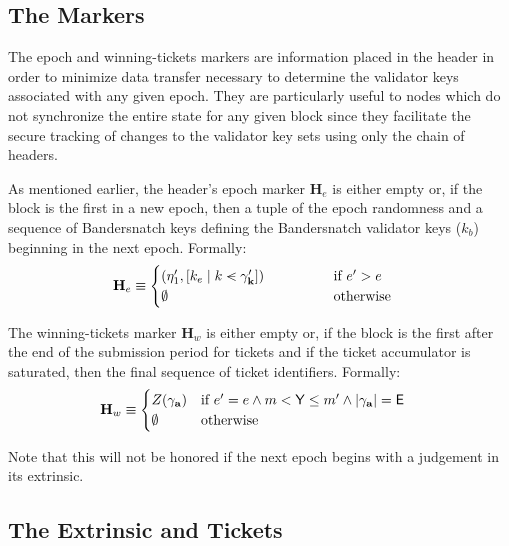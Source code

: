 \subsection{The Markers}\label{sec:epochmarker}

The epoch and winning-tickets markers are information placed in the header in order to minimize data transfer necessary to determine the validator keys associated with any given epoch. They are particularly useful to nodes which do not synchronize the entire state for any given block since they facilitate the secure tracking of changes to the validator key sets using only the chain of headers.

As mentioned earlier, the header's epoch marker $\mathbf{H}_e$ is either empty or, if the block is the first in a new epoch, then a tuple of the epoch randomness and a sequence of Bandersnatch keys defining the Bandersnatch validator keys ($k_b$) beginning in the next epoch. Formally:
\begin{align}\label{eq:epochmarker}
  \mathbf{H}_e &\equiv \begin{cases}
    ( \eta'_1, [ k_e \mid k \orderedin \gamma'_\mathbf{k} ] )\qquad\qquad &\when e' > e \\
    \none & \otherwise
  \end{cases}
\end{align}

The winning-tickets marker $\mathbf{H}_w$ is either empty or, if the block is the first after the end of the submission period for tickets and if the ticket accumulator is saturated, then the final sequence of ticket identifiers. Formally:
\begin{align}\label{eq:winningticketsmarker}
  \mathbf{H}_w &\equiv \begin{cases}
    Z(\gamma_\mathbf{a}) &\text{if } e' = e \wedge m < \mathsf{Y} \le m' \wedge |\gamma_\mathbf{a}| = \mathsf{E} \\
    \emptyset & \text{otherwise}
  \end{cases}
\end{align}

 Note that this will not be honored if the next epoch begins with a judgement in its extrinsic.














\subsection{The Extrinsic and Tickets}

